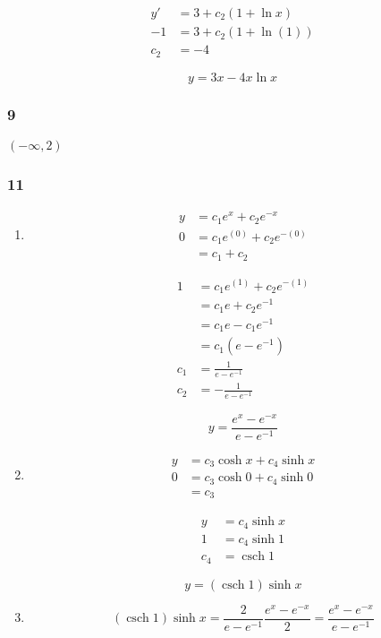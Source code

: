\documentclass{article}
\DeclareMathOperator{\csch}{csch}
\begin{document}
\begin{align*}
  y'  & = 3 + c_2 (1 + \ln x)   \\
  -1  & = 3 + c_2 (1 + \ln (1)) \\
  c_2 & = -4
\end{align*}

\[y = 3 x - 4 x \ln x\]

\subsubsection{9}

$(-\infty, 2)$

\subsubsection{11}

\begin{enumerate}
  \item

        \begin{align*}
          y & = c_1 e^x + c_2 e^{-x}       \\
          0 & = c_1 e^{(0)} + c_2 e^{-(0)} \\
            & = c_1 + c_2
        \end{align*}

        \begin{align*}
          1   & = c_1 e^{(1)} + c_2 e^{-(1)} \\
              & = c_1 e + c_2 e^{-1}         \\
              & = c_1 e - c_1 e^{-1}         \\
              & = c_1 (e - e^{-1})           \\
          c_1 & = \frac{1}{e - e^{-1}}       \\
          c_2 & = -\frac{1}{e - e^{-1}}
        \end{align*}

        \[y = \frac{e^x - e^{-x}}{e - e^{-1}}\]

  \item

        \begin{align*}
          y & = c_3 \cosh x + c_4 \sinh x \\
          0 & = c_3 \cosh 0 + c_4 \sinh 0 \\
            & = c_3
        \end{align*}

        \begin{align*}
          y   & = c_4 \sinh x \\
          1   & = c_4 \sinh 1 \\
          c_4 & = \csch 1
        \end{align*}

        \[y = (\csch 1) \sinh x\]

  \item

        \[(\csch 1) \sinh x = \frac{2}{e - e^{-1}} \frac{e^x - e^{-x}}{2} = \frac{e^x - e^{-x}}{e - e^{-1}}\]

\end{enumerate}
\end{document}
